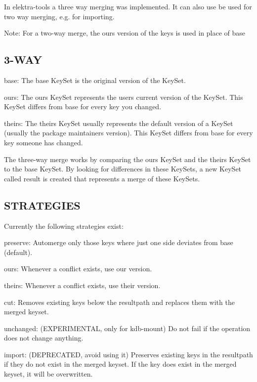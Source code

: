 In elektra-\/tools a three way merging was implemented. It can also use be used for two way merging, e.\+g. for importing.

Note\+: For a two-\/way merge, the {\ttfamily ours} version of the keys is used in place of {\ttfamily base}

\subsection*{3-\/\+W\+AY}


\begin{DoxyItemize}
\item {\ttfamily base}\+: The {\ttfamily base} Key\+Set is the original version of the Key\+Set.
\item {\ttfamily ours}\+: The {\ttfamily ours} Key\+Set represents the user\textquotesingle{}s current version of the Key\+Set. This Key\+Set differs from {\ttfamily base} for every key you changed.
\item {\ttfamily theirs}\+: The {\ttfamily theirs} Key\+Set usually represents the default version of a Key\+Set (usually the package maintainer\textquotesingle{}s version). This Key\+Set differs from {\ttfamily base} for every key someone has changed.
\end{DoxyItemize}

The three-\/way merge works by comparing the {\ttfamily ours} Key\+Set and the {\ttfamily theirs} Key\+Set to the {\ttfamily base} Key\+Set. By looking for differences in these Key\+Sets, a new Key\+Set called {\ttfamily result} is created that represents a merge of these Key\+Sets.

\subsection*{S\+T\+R\+A\+T\+E\+G\+I\+ES}

Currently the following strategies exist\+:


\begin{DoxyItemize}
\item preserve\+: Automerge only those keys where just one side deviates from base (default).
\item ours\+: Whenever a conflict exists, use our version.
\item theirs\+: Whenever a conflict exists, use their version.
\item cut\+: Removes existing keys below the resultpath and replaces them with the merged keyset.
\item unchanged\+: (E\+X\+P\+E\+R\+I\+M\+E\+N\+T\+AL, only for kdb-\/mount) Do not fail if the operation does not change anything.
\item import\+: (D\+E\+P\+R\+E\+C\+A\+T\+ED, avoid using it) Preserves existing keys in the resultpath if they do not exist in the merged keyset. If the key does exist in the merged keyset, it will be overwritten. 
\end{DoxyItemize}